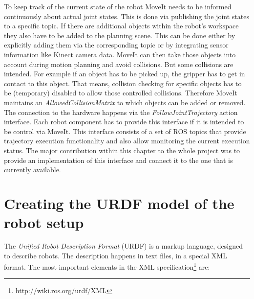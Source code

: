 To keep track of the current state of the robot MoveIt needs to be informed continuously about actual joint states. This is done via publishing the joint states to a specific topic. If there are additional objects within the robot's workspace they also have to be added to the planning scene. This can be done either by explicitly adding them via the corresponding topic or by integrating sensor information like Kinect camera data. MoveIt can then take those objects into account during motion planning and avoid collisions. But some collisions are intended. For example if an object has to be picked up, the gripper has to get in contact to this object. That means, collision checking for specific objects has to be (temporary) disabled to allow those controlled collisions. Therefore MoveIt maintains an \emph{AllowedCollisionMatrix} to which objects can be added or removed. The connection to the hardware happens via the \emph{FollowJointTrajectory} action interface. Each robot component has to provide this interface if it is intended to be control via MoveIt. This interface consists of a set of ROS topics that provide trajectory execution functionality and also allow monitoring the current execution status. The major contribution within this chapter to the whole project was to provide an implementation of this interface and connect it to the one that is currently available.

\section{Creating the URDF model of the robot setup}
\label{sec:urdf}

The \emph{Unified Robot Description Format} (URDF) is a markup language, designed to describe robots. The description happens in text files, in a special XML format. The most important elements in the XML specification\footnote{http://wiki.ros.org/urdf/XML} are:

